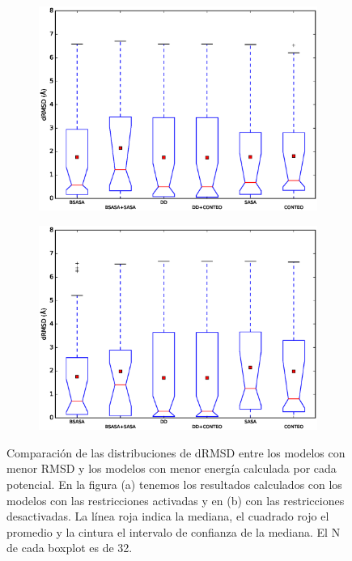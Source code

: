\begin{figure}[hp]
  \centering  
  \begin{subfigure}{.8\linewidth}
    \centering
    \includegraphics[width=\linewidth]{figures/resultados/dna/initial15.eps}
    \caption{}
  \end{subfigure}
  \begin{subfigure}{.8\linewidth}
    \centering
    \includegraphics[width=\linewidth]{figures/resultados/dna/initial15_rsr_off.eps}
    \caption{}
  \end{subfigure}
 
\caption[Comparación de las distribuciones de dRMSD entre los modelos con menor RMSD y los modelos con menor energía calculado por cada potencial]{Comparación de las distribuciones de dRMSD entre los modelos con menor RMSD y los modelos con menor energía calculada por cada potencial. En la figura (a) tenemos los resultados calculados con los modelos con las restricciones activadas y en (b) con las restricciones desactivadas. La línea roja indica la mediana, el cuadrado rojo el promedio y la cintura el intervalo de confianza de la mediana. El N de cada boxplot es de 32.}
\label{fig:dna1}
\end{figure}

